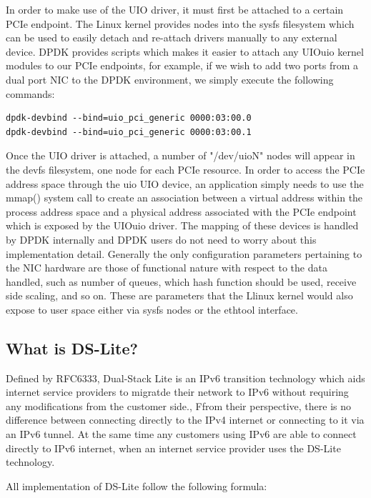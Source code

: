 \documentclass[a4paper,12p]{article}
\begin{document}
In order to make use of the UIO driver, it must first be attached to a certain PCIe endpoint. The Linux kernel provides nodes into the sysfs filesystem which can be used to easily detach and re-attach drivers manually to any external device. DPDK provides scripts which makes it easier to attach any UIOuio kernel modules to our PCIe endpoints, for example, if we wish to add two ports from a dual port NIC to the DPDK environment, we simply execute the following commands:

\begin{lstlisting}
dpdk-devbind --bind=uio_pci_generic 0000:03:00.0
dpdk-devbind --bind=uio_pci_generic 0000:03:00.1
\end{lstlisting}

 Once the UIO driver is attached, a number of "/dev/uioN" nodes will appear in the devfs filesystem, one node for each PCIe resource. In order to access the PCIe address space through the uio UIO device, an application simply needs to use the mmap() system call to create an association between a virtual address within the process address space and a physical address associated with the PCIe endpoint which is exposed by the UIOuio driver. The mapping of these devices is handled by DPDK internally and DPDK users do not need to worry about this implementation detail. Generally the only configuration parameters pertaining to the NIC hardware are those of functional nature with respect to the data handled, such as number of queues, which hash function should be used, receive side scaling, and so on. These are parameters that the Llinux kernel would also expose to user space either via sysfs nodes or the ethtool interface.

\subsection{What is DS-Lite?}

Defined by RFC6333, Dual-Stack Lite is an IPv6 transition technology which aids internet service providers to migratde their network to IPv6 without requiring any modifications from the customer side., Ffrom their perspective, there is no difference between connecting directly to the IPv4 internet or connecting to it via an IPv6 tunnel. At the same time any customers using IPv6 are able to connect directly to IPv6 internet, when an internet service provider uses the DS-Lite technology.

All implementation of DS-Lite follow the following formula:
\end{document}
